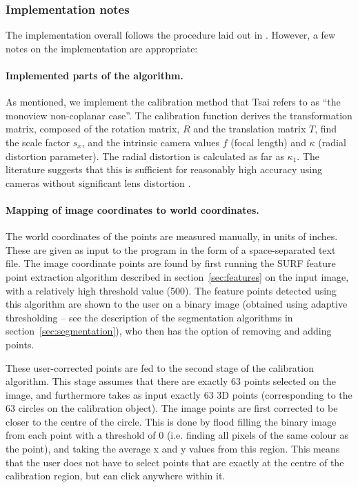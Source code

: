 \subsubsection{Implementation notes}
The implementation overall follows the procedure laid out in
\cite{TSAI}. However, a few notes on the implementation are
appropriate:

\paragraph{Implemented parts of the algorithm.}
As mentioned, we implement the calibration method that Tsai refers to
as ``the monoview non-coplanar case''. The calibration function derives
the transformation matrix, composed of the rotation matrix, $R$ and
the translation matrix $T$, find the scale factor $s_x$, and the
intrinsic camera values $f$ (focal length) and $\kappa$ (radial
distortion parameter). The radial distortion is calculated as far as
$\kappa_1$. The literature suggests that this is sufficient for
reasonably high accuracy using cameras without significant lens
distortion \cite{algebraic-distortion}.

\paragraph{Mapping of image coordinates to world coordinates.}
The world coordinates of the points are measured manually, in units of
inches. These are given as input to the program in the form of a
space-separated text file. The image coordinate points are found by
first running the SURF feature point extraction algorithm described in
section~\ref{sec:features} on the input image, with a relatively high
threshold value (500). The feature points detected using this
algorithm are shown to the user on a binary image (obtained using
adaptive thresholding -- see the description of the segmentation
algorithms in section~\ref{sec:segmentation}), who then has the option
of removing and adding points.

These user-corrected points are fed to the second stage of the
calibration algorithm. This stage assumes that there are exactly 63
points selected on the image, and furthermore takes as input exactly
63 3D points (corresponding to the 63 circles on the calibration
object). The image points are first corrected to be closer to the
centre of the circle. This is done by flood filling the binary image
from each point with a threshold of 0 (i.e. finding all pixels of the
same colour as the point), and taking the average x and y values from
this region. This means that the user does not have to select points
that are exactly at the centre of the calibration region, but can
click anywhere within it.

